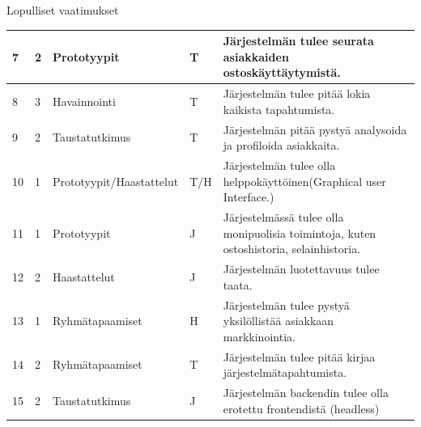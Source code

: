 \documentclass{beamer}
\begin{document}
\begin{frame}{Lopulliset vaatimukset}
\begin{table}[]
{\begin{tabular}{lllll}
    \multicolumn{1}{|l|}{7}		&			 \multicolumn{1}{|l|}{2}& \multicolumn{1}{l|}{Prototyypit}				& \multicolumn{1}{l|}{T}                                      & \multicolumn{1}{l|}{Järjestelmän tulee seurata asiakkaiden ostoskäyttäytymistä.}                              \\ \hline
    \multicolumn{1}{|l|}{8}		&			 \multicolumn{1}{|l|}{3}& \multicolumn{1}{l|}{Havainnointi}				& \multicolumn{1}{l|}{T}                                      & \multicolumn{1}{l|}{Järjestelmän tulee pitää lokia kaikista tapahtumista.}                                   \\ \hline
    \multicolumn{1}{|l|}{9}		&			 \multicolumn{1}{|l|}{2}& \multicolumn{1}{l|}{Taustatutkimus}			& \multicolumn{1}{l|}{T}                                      & \multicolumn{1}{l|}{Järjestelmän pitää pystyä analysoida ja profiloida asiakkaita.}                         \\ \hline
    \multicolumn{1}{|l|}{10}		&			 \multicolumn{1}{|l|}{1}& \multicolumn{1}{l|}{Prototyypit/Haastattelut}& \multicolumn{1}{l|}{T/H}                                    & \multicolumn{1}{l|}{Järjestelmän tulee olla helppokäyttöinen(Graphical user Interface.)}                    \\ \hline
    \multicolumn{1}{|l|}{11}		&			 \multicolumn{1}{|l|}{1}& \multicolumn{1}{l|}{Prototyypit}			& \multicolumn{1}{l|}{J}                                    & \multicolumn{1}{l|}{Järjestelmässä tulee olla monipuolisia toimintoja, kuten ostoshistoria, selainhistoria.}\\ \hline
    \multicolumn{1}{|l|}{12}		&			 \multicolumn{1}{|l|}{2}& \multicolumn{1}{l|}{Haastattelut}			& \multicolumn{1}{l|}{J}                                    & \multicolumn{1}{l|}{Järjestelmän luotettavuus tulee taata.}                                                 \\ \hline
    \multicolumn{1}{|l|}{13}		&			 \multicolumn{1}{|l|}{1}& \multicolumn{1}{l|}{Ryhmätapaamiset}	& \multicolumn{1}{l|}{H}                                    & \multicolumn{1}{l|}{Järjestelmän tulee pystyä yksilöllistää asiakkaan markkinointia.}                       \\ \hline
		\multicolumn{1}{|l|}{14}		&			 \multicolumn{1}{|l|}{2}& \multicolumn{1}{l|}{Ryhmätapaamiset}	& \multicolumn{1}{l|}{T}                                    & \multicolumn{1}{l|}{Järjestelmän tulee pitää kirjaa järjestelmätapahtumista.}                               \\ \hline
		\multicolumn{1}{|l|}{15}		&			 \multicolumn{1}{|l|}{2}& \multicolumn{1}{l|}{Taustatutkimus}	& \multicolumn{1}{l|}{J}                                    & \multicolumn{1}{l|}{Järjestelmän backendin tulee olla erotettu frontendistä (headless)}                               \\ \hline

\end{tabular}}
\end{table}
\end{frame}
\end{document}
